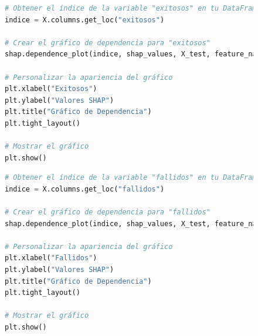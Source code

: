 \begin{figure}[ht]
    \centering
    \begin{minipage}{0.48\textwidth}
        \begin{lstlisting}[language=Python, caption=Grafico de dependencia exitosos, label=lst:grafDepExitosos]
# Obtener el índice de la variable "exitosos" en tu DataFrame
indice = X.columns.get_loc("exitosos")

# Crear el gráfico de dependencia para "exitosos"
shap.dependence_plot(indice, shap_values, X_test, feature_names=X.columns, show=False)

# Personalizar la apariencia del gráfico
plt.xlabel("Exitosos")
plt.ylabel("Valores SHAP")
plt.title("Gráfico de Dependencia")
plt.tight_layout()

# Mostrar el gráfico
plt.show()
        \end{lstlisting}
    \end{minipage}
    \hfill
    \begin{minipage}{0.48\textwidth}
        \begin{lstlisting}[language=Python, caption=Grafico de dependencia fallidos, label=lst:grafDepFallidos]
# Obtener el índice de la variable "fallidos" en tu DataFrame
indice = X.columns.get_loc("fallidos")

# Crear el gráfico de dependencia para "fallidos"
shap.dependence_plot(indice, shap_values, X_test, feature_names=X.columns, show=False)

# Personalizar la apariencia del gráfico
plt.xlabel("Fallidos")
plt.ylabel("Valores SHAP")
plt.title("Gráfico de Dependencia")
plt.tight_layout()

# Mostrar el gráfico
plt.show()
        \end{lstlisting}
    \end{minipage}
\end{figure}

